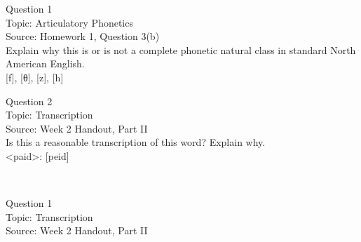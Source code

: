 \documentclass[12pt]{article}
\begin{document}
\begin{center}
\textbf{{\color{blue}{\HUGE START OF EXAM\\}}}

\textbf{{\color{blue}{\HUGE Student ID: 56567\\}}}

\textbf{{\color{blue}{\HUGE 4:30\\}}}

\end{center}
\newpage

{\large Question 1}\\

Topic: Articulatory Phonetics\\
Source: Homework 1, Question 3(b)\\

Explain why this is or is not a complete phonetic natural class in standard North American English.\\

{[f]}, {[θ]}, {[z]}, {[h]}


\newpage

{\large Question 2}\\

Topic: Transcription\\
Source: Week 2 Handout, Part II\\

Is this a reasonable transcription of this word? Explain why.\\

<paid>: {[peid]}


\newpage

\begin{center}
\textbf{{\color{red}{\HUGE END OF EXAM}}}\\

\end{center}
\newpage

\begin{center}
\textbf{{\color{blue}{\HUGE START OF EXAM\\}}}

\textbf{{\color{blue}{\HUGE Student ID: 36273\\}}}

\textbf{{\color{blue}{\HUGE 4:40\\}}}

\end{center}
\newpage

{\large Question 1}\\

Topic: Transcription\\
Source: Week 2 Handout, Part II\\
\end{document}
